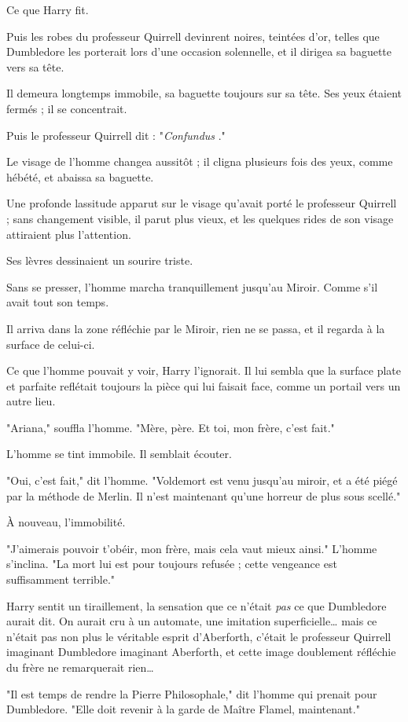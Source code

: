 Ce que Harry fit.

Puis les robes du professeur Quirrell devinrent noires, teintées d'or, telles que Dumbledore les porterait lors d'une occasion solennelle, et il dirigea sa baguette vers sa tête.

Il demeura longtemps immobile, sa baguette toujours sur sa tête. Ses yeux étaient fermés ; il se concentrait.

Puis le professeur Quirrell dit : "\emph{Confundus} ."

Le visage de l'homme changea aussitôt ; il cligna plusieurs fois des yeux, comme hébété, et abaissa sa baguette.

Une profonde lassitude apparut sur le visage qu'avait porté le professeur Quirrell ; sans changement visible, il parut plus vieux, et les quelques rides de son visage attiraient plus l'attention.

Ses lèvres dessinaient un sourire triste.

Sans se presser, l'homme marcha tranquillement jusqu'au Miroir. Comme s'il avait tout son temps.

Il arriva dans la zone réfléchie par le Miroir, rien ne se passa, et il regarda à la surface de celui-ci.

Ce que l'homme pouvait y voir, Harry l'ignorait. Il lui sembla que la surface plate et parfaite reflétait toujours la pièce qui lui faisait face, comme un portail vers un autre lieu.

"Ariana," souffla l'homme. "Mère, père. Et toi, mon frère, c'est fait."

L'homme se tint immobile. Il semblait écouter.

"Oui, c'est fait," dit l'homme. "Voldemort est venu jusqu'au miroir, et a été piégé par la méthode de Merlin. Il n'est maintenant qu'une horreur de plus sous scellé."

À nouveau, l'immobilité.

"J'aimerais pouvoir t'obéir, mon frère, mais cela vaut mieux ainsi." L'homme s'inclina. "La mort lui est pour toujours refusée ; cette vengeance est suffisamment terrible."

Harry sentit un tiraillement, la sensation que ce n'était \emph{pas}  ce que Dumbledore aurait dit. On aurait cru à un automate, une imitation superficielle… mais ce n'était pas non plus le véritable esprit d'Aberforth, c'était le professeur Quirrell imaginant Dumbledore imaginant Aberforth, et cette image doublement réfléchie du frère ne remarquerait rien…

"Il est temps de rendre la Pierre Philosophale," dit l'homme qui prenait pour Dumbledore. "Elle doit revenir à la garde de Maître Flamel, maintenant."

